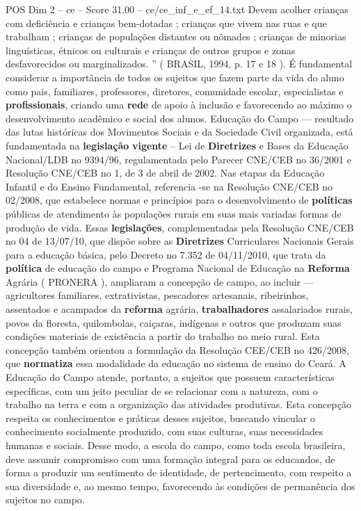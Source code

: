 \begin{textsample}{POS Dim 2 – ce – Score 31.00 – ce/ce\_inf\_e\_ef\_14.txt}
Devem acolher crianças com deficiência e crianças bem-dotadas ; crianças que vivem nas ruas e que trabalham ; crianças de populações distantes ou nômades ; crianças de minorias linguísticas, étnicos ou culturais e crianças de outros grupos e zonas desfavorecidos ou marginalizados. ” ( BRASIL, 1994, p. 17 e 18 ).
É fundamental considerar a importância de todos os sujeitos que fazem parte da vida do aluno como pais, familiares, professores, diretores, comunidade escolar, especialistas e \textbf{profissionais}, criando uma \textbf{rede} de apoio à inclusão e favorecendo ao máximo o desenvolvimento acadêmico e social dos alunos.
Educação do Campo — resultado das lutas históricas dos Movimentos Sociais e da Sociedade Civil organizada, está fundamentada na \textbf{legislação} \textbf{vigente} – Lei de \textbf{Diretrizes} e Bases da Educação Nacional/LDB no 9394/96, regulamentada pelo Parecer CNE/CEB no 36/2001 e Resolução CNE/CEB no 1, de 3 de abril de 2002.
Nas etapas da Educação Infantil e do Ensino Fundamental, referencia -se na Resolução CNE/CEB no 02/2008, que estabelece normas e princípios para o desenvolvimento de \textbf{políticas} públicas de atendimento às populações rurais em suas mais variadas formas de produção de vida.
Essas \textbf{legislações}, complementadas pela Resolução CNE/CEB no 04 de 13/07/10, que dispõe sobre as \textbf{Diretrizes} Curriculares Nacionais Gerais para a educação básica, pelo Decreto no 7.352 de 04/11/2010, que trata da \textbf{política} de educação do campo e Programa Nacional de Educação na \textbf{Reforma} Agrária ( PRONERA ), ampliaram a concepção de campo, ao incluir — agricultores familiares, extrativistas, pescadores artesanais, ribeirinhos, assentados e acampados da \textbf{reforma} agrária, \textbf{trabalhadores} assalariados rurais, povos da floresta, quilombolas, caiçaras, indígenas e outros que produzam suas condições materiais de existência a partir do trabalho no meio rural.
Esta concepção também orientou a formulação da Resolução CEE/CEB no 426/2008, que \textbf{normatiza} essa modalidade da educação no sistema de ensino do Ceará.
A Educação do Campo atende, portanto, a sujeitos que possuem características específicas, com um jeito peculiar de se relacionar com a natureza, com o trabalho na terra e com a organização das atividades produtivas.
Esta concepção respeita os conhecimentos e práticas desses sujeitos, buscando vincular o conhecimento socialmente produzido, com suas culturas, suas necessidades humanas e sociais.
Desse modo, a escola do campo, como toda escola brasileira, deve assumir compromisso com uma formação integral para os educandos, de forma a produzir um sentimento de identidade, de pertencimento, com respeito a sua diversidade e, ao mesmo tempo, favorecendo às condições de permanência dos sujeitos no campo.

\end{textsample}

